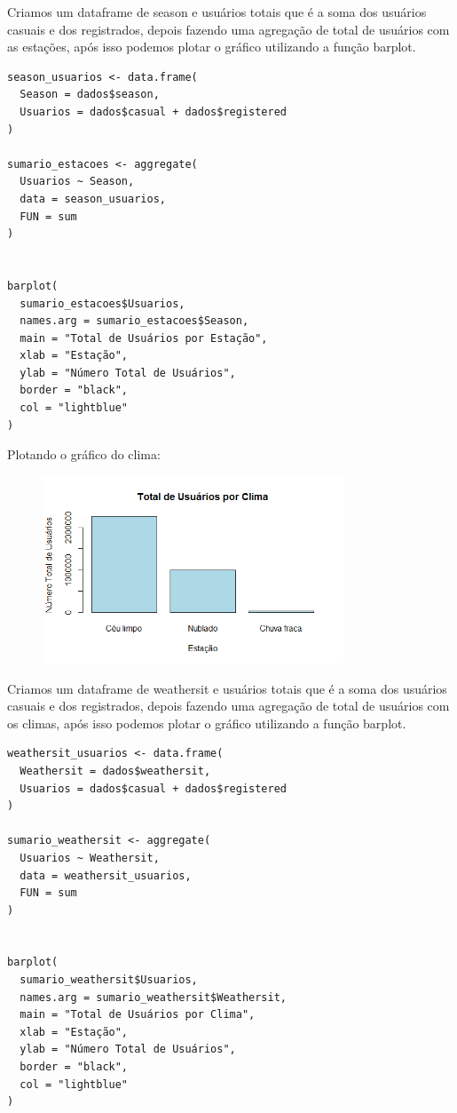 \documentclass[a4paper,11pt]{article}
\begin{document}
\begin{description}[leftmargin=*]
Criamos um dataframe de season e usuários totais que é a soma dos usuários casuais e dos registrados, depois fazendo uma agregação de total de usuários com as estações, após isso podemos plotar o gráfico utilizando a função barplot.

\begin{lstlisting}
season_usuarios <- data.frame(
  Season = dados$season,
  Usuarios = dados$casual + dados$registered
)

sumario_estacoes <- aggregate(
  Usuarios ~ Season,             
  data = season_usuarios,
  FUN = sum
)


barplot(
  sumario_estacoes$Usuarios,
  names.arg = sumario_estacoes$Season, 
  main = "Total de Usuários por Estação",
  xlab = "Estação",
  ylab = "Número Total de Usuários",
  border = "black",
  col = "lightblue"
)

\end{lstlisting}

Plotando o gráfico do clima:

\begin{figure}[H] 
    \centering 
    \includegraphics[width=0.8\textwidth]{Imagens/Graficos/Distribuição clima.png} 
\end{figure}

Criamos um dataframe de weathersit e usuários totais que é a soma dos usuários casuais e dos registrados, depois fazendo uma agregação de total de usuários com os climas, após isso podemos plotar o gráfico utilizando a função barplot.

\begin{lstlisting}
weathersit_usuarios <- data.frame(
  Weathersit = dados$weathersit,
  Usuarios = dados$casual + dados$registered
)

sumario_weathersit <- aggregate(
  Usuarios ~ Weathersit,             
  data = weathersit_usuarios,
  FUN = sum
)


barplot(
  sumario_weathersit$Usuarios,
  names.arg = sumario_weathersit$Weathersit, 
  main = "Total de Usuários por Clima",
  xlab = "Estação",
  ylab = "Número Total de Usuários",
  border = "black",
  col = "lightblue"
)
\end{lstlisting}


\end{description}
\end{document}
